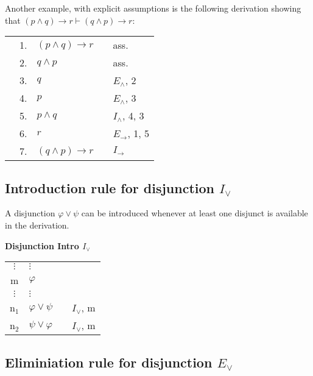 \documentclass[nobib,nofonts]{tufte-handout}
\begin{document}
Another example, with explicit assumptions is the following derivation showing that  $(p \wedge q) \rightarrow r \vdash (q \wedge p) \rightarrow r$:

\begin{tabular}{cclcl}
                     & 1. & $(p \wedge q) \rightarrow r$ & & ass. \\
  \cline{1-2} \vline & 2. & $q \wedge p$                 & & ass. \\
  \vline             & 3. & $q$                          & & $E_{\wedge}$, 2  \\
  \vline             & 4. & $p$                          & & $E_{\wedge}$, 3  \\
  \vline             & 5. & $p \wedge q$                 & & $I_{\wedge}$, 4, 3  \\
  \vline             & 6. & $r$                          & & $E_{\rightarrow}$, 1, 5  \\ \hline
                     & 7. & $(q \wedge p) \rightarrow r$ & & $I_{\rightarrow}$
\end{tabular}

\subsection{Introduction rule for disjunction $I_{\vee}$}

A disjunction $\varphi \vee \psi$ can be introduced whenever at least one disjunct is available in the derivation.

\bigskip
\noindent \colorbox{mygray!60}{\centering
  \begin{minipage}[t]{0.35\linewidth}
    \textbf{Disjunction Intro $I_{\vee}$}
  \end{minipage}
  \begin{minipage}[t]{0.55\linewidth}
    \begin{tabular}{clcl}
      $\vdots$ & $\vdots$                   & \\
      m & $\varphi$  &  \\
      $\vdots$ & $\vdots$                   & \\
      n$_{1}$ & $\varphi \vee \psi$ & & $I_{\vee}$, m \\
      n$_{2}$ & $\psi \vee \varphi$ & & $I_{\vee}$, m
    \end{tabular}
  \end{minipage}
}
\bigskip


\subsection{Eliminiation rule for disjunction $E_{\vee}$}
\end{document}
